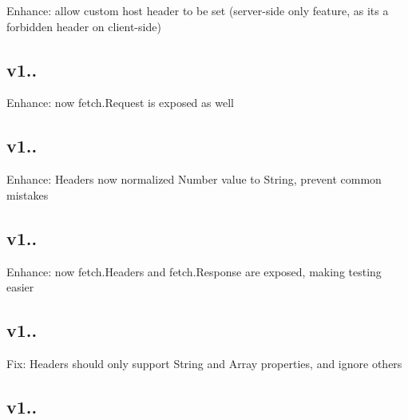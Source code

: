 \begin{DoxyItemize}
\item Enhance\+: allow custom host header to be set (server-\/side only feature, as it\textquotesingle{}s a forbidden header on client-\/side)
\end{DoxyItemize}

\subsection*{v1..}


\begin{DoxyItemize}
\item Enhance\+: now {\ttfamily fetch.\+Request} is exposed as well
\end{DoxyItemize}

\subsection*{v1..}


\begin{DoxyItemize}
\item Enhance\+: {\ttfamily Headers} now normalized {\ttfamily Number} value to {\ttfamily String}, prevent common mistakes
\end{DoxyItemize}

\subsection*{v1..}


\begin{DoxyItemize}
\item Enhance\+: now fetch.\+Headers and fetch.\+Response are exposed, making testing easier
\end{DoxyItemize}

\subsection*{v1..}


\begin{DoxyItemize}
\item Fix\+: {\ttfamily Headers} should only support {\ttfamily String} and {\ttfamily Array} properties, and ignore others
\end{DoxyItemize}

\subsection*{v1..}


